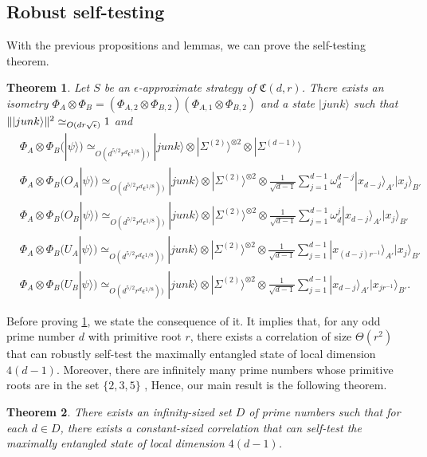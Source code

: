 \documentclass[11pt,letterpaper]{article}
\newcommand{\ket}[1]{|#1\rangle}
\newcommand{\x}{\otimes}
\DeclarePairedDelimiter{\norm}{\lVert}{\rVert}
\newcommand{\1}{\mathbb{1}}
\newcommand{\EPR}[1]{\Sigma^{(#1)}}
\newcommand{\fC}{\mathfrak{C}}
\newcommand{\ep}{\epsilon}
\newcommand{\se}{\sqrt{\epsilon}}
\newcommand{\appd}[1]{\simeq_{#1}}
\newtheorem{theorem}{Theorem}[section]
\theoremstyle{definition}
\begin{document}
\subsection{Robust self-testing}
\label{sec:self-test}
With the previous propositions and lemmas, we can prove the self-testing theorem.
\begin{theorem}
	\label{thm:self-test}
	Let $S$ be an $\ep$-approximate strategy of $\fC(d,r)$.
	There exists an isometry   
	$\Phi_A \x \Phi_B = (\Phi_{A,2} \x \Phi_{B,2})(\Phi_{A,1}\x\Phi_{B,2})$ and a state $\ket{junk}$
	such that $\norm{\ket{junk}}^2 \appd{O(dr\se)} 1$ and 
	\begin{align}
		&\Phi_A \x \Phi_B (\ket{\psi}) \appd{O(d^{5/2} r^{d} \ep^{1/8}))} \ket{junk} \x \ket{\EPR{2}}^{\x 2} \x \ket{\EPR{d-1}}\\	
		&\Phi_A \x \Phi_B (O_A\ket{\psi}) \appd{O(d^{5/2} r^{d}\ep^{1/8}))} \ket{junk} \x \ket{\EPR{2}}^{\x 2} \x
		\frac{1}{\sqrt{d-1}}\sum_{j=1}^{d-1} \omega_d^{d-j}\ket{x_{d-j}}_{A'}\ket{x_j}_{B'} \\
		&\Phi_A \x \Phi_B (O_B\ket{\psi}) \appd{O(d^{5/2}r^{d} \ep^{1/8}))} \ket{junk} \x \ket{\EPR{2}}^{\x 2} \x
		\frac{1}{\sqrt{d-1}}\sum_{j=1}^{d-1} \omega_d^{j}\ket{x_{d-j}}_{A'}\ket{x_j}_{B'}\\
		&\Phi_A \x \Phi_B (U_A\ket{\psi}) \appd{O(d^{5/2} r^{d}  \ep^{1/8}))} \ket{junk} \x \ket{\EPR{2}}^{\x 2} \x
		\frac{1}{\sqrt{d-1}}\sum_{j=1}^{d-1} \ket{x_{(d-j)r^{-1}}}_{A'}\ket{x_j}_{B'} \\
		&\Phi_A \x \Phi_B (U_B\ket{\psi}) \appd{O(d^{5/2} r^{d}\ep^{1/8}))} \ket{junk} \x \ket{\EPR{2}}^{\x 2} \x
		\frac{1}{\sqrt{d-1}}\sum_{j=1}^{d-1} \ket{x_{d-j}}_{A'}\ket{x_{j r^{-1}}}_{B'}.
	\end{align}
\end{theorem}
Before proving \cref{thm:self-test}, we state the consequence of it.
It implies that,
for any odd prime number $d$ with primitive root $r$, 
there exists a correlation of size $\Theta(r^2)$ that can robustly self-test the maximally
entangled state of local dimension $4(d-1)$.
Moreover, there are infinitely many prime numbers
whose primitive roots are in the set $\{2,3,5\}$ \cite{murty1988},
Hence, our main result is the following theorem.
\begin{theorem}
	There exists an infinity-sized set $D$ of prime numbers such that 
	for each $d \in D$, there exists
	a constant-sized correlation that can self-test the maximally entangled state
	of local dimension $4(d-1)$.
\end{theorem}
\end{document}
